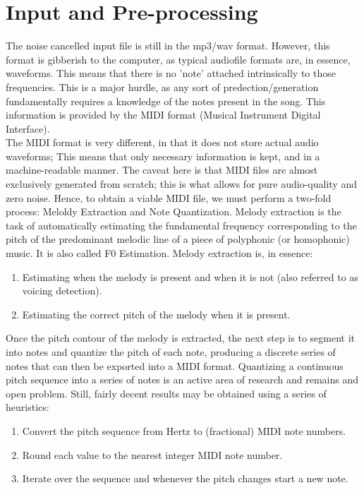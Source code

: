 \documentclass[12pt]{report}
\begin{document}
\section{Input and Pre-processing}
The noise cancelled input file is still in the mp3/wav format. However, this format is gibberish to the computer, as typical audiofile formats are, in essence, waveforms. This means that there is no 'note' attached intrinsically to those frequencies. This is a major hurdle, as any sort of predection/generation fundamentally requires a knowledge of the notes present in the song. This information is provided by the MIDI format (Musical Instrument Digital Interface).\\The MIDI format is very different, in that it does not store actual audio waveforms; This means that only necessary information is kept, and in a machine-readable manner. The caveat here is that MIDI files are almost exclusively generated from scratch; this is what allows for pure audio-quality and zero noise. Hence, to obtain a viable MIDI file, we must perform a two-fold process: Meloldy Extraction and Note Quantization. Melody extraction is the task of automatically estimating the fundamental frequency corresponding to the pitch of the predominant melodic line of a piece of polyphonic (or homophonic) music. It is also called F0 Estimation. Melody extraction is, in essence:
\begin{enumerate}[leftmargin=2cm]
\item Estimating when the melody is present and when it is not (also referred to as voicing detection).
\item Estimating the correct pitch of the melody when it is present.
\end{enumerate} Once the pitch contour of the melody is extracted, the next step is to segment it into notes and quantize the pitch of each note, producing a discrete series of notes that can then be exported into a MIDI format. Quantizing a continuous pitch sequence into a series of notes is an active area of research and remains and open problem. Still, fairly decent results may be obtained using a series of heuristics: \begin{enumerate}[leftmargin=2cm]
\item Convert the pitch sequence from Hertz to (fractional) MIDI note numbers.
\item Round each value to the nearest integer MIDI note number.
\item Iterate over the sequence and whenever the pitch changes start a new note.
\end{enumerate}
\end{document}
